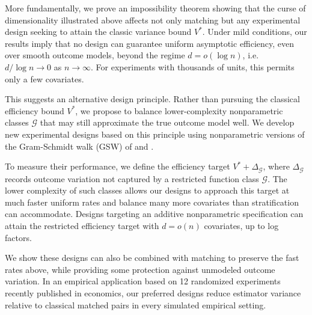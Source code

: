 \documentclass[letterpaper,12pt]{article}
\theoremstyle{definition}
\numberwithin{equation}{section}
\newcommand{\mc}{\mathcal}
\begin{document}
More fundamentally, we prove an impossibility theorem showing that the curse of dimensionality illustrated above affects not only matching but any experimental design seeking to attain the classic variance bound $V^*$.
Under mild conditions, our results imply that no design can guarantee uniform asymptotic efficiency, even over smooth outcome models, beyond the regime $d=o(\log n)$, i.e.\ $d / \log n \to 0$ as $n \to \infty$.
For experiments with thousands of units, this permits only a few covariates.

This suggests an alternative design principle.
Rather than pursuing the classical efficiency bound $V^*$, we propose to balance lower-complexity nonparametric classes $\mc G$ that may still approximate the true outcome model well.
We develop new experimental designs based on this principle using nonparametric versions of the Gram-Schmidt walk (GSW) of \citet{bansal2019gram} and \citet{harshaw2024gsw}.

To measure their performance, we define the efficiency target $V^*+\Delta_{\mc G}$, where $\Delta_{\mc G}$ records outcome variation not captured by a restricted function class $\mc G$.
The lower complexity of such classes allows our designs to approach this target at much faster uniform rates and balance many more covariates than stratification can accommodate.
Designs targeting an additive nonparametric specification can attain the restricted efficiency target with $d=o(n)$ covariates, up to log factors.

We show these designs can also be combined with matching to preserve the fast rates above, while providing some protection against unmodeled outcome variation.
In an empirical application based on 12 randomized experiments recently published in economics, our preferred designs reduce estimator variance relative to classical matched pairs in every simulated empirical setting.
\end{document}
